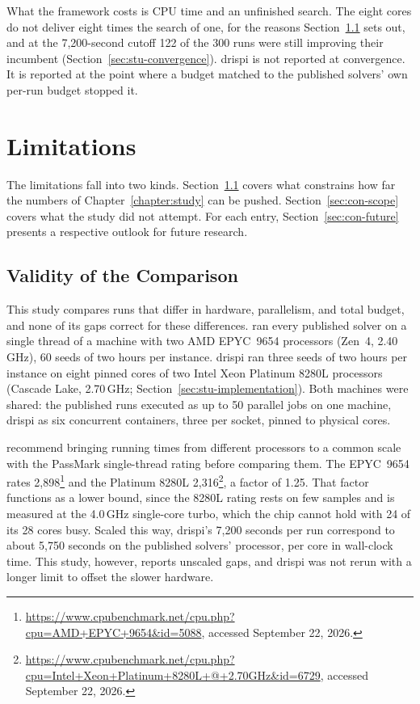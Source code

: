 What the framework costs is CPU time and an unfinished search. The eight cores
do not deliver eight times the search of one, for the reasons
Section~\ref{sec:con-validity} sets out, and at the 7,200-second cutoff
122 of the 300 runs were still improving their incumbent
(Section~\ref{sec:stu-convergence}). \gls{drispi} is not reported at convergence.
It is reported at the point where a budget matched to the published solvers' own
per-run budget stopped it.

\section{Limitations}
\label{sec:con-limitations}

The limitations fall into two kinds. Section~\ref{sec:con-validity}
covers what constrains how far the numbers of Chapter~\ref{chapter:study} can be pushed.
Section~\ref{sec:con-scope} covers what the study did not attempt. For each entry, Section~\ref{sec:con-future} presents a respective outlook for future research.

\subsection{Validity of the Comparison}
\label{sec:con-validity}

This study compares runs that differ in hardware, parallelism, and total budget, and none of its gaps correct for these
differences. \citet{queirogaXLInstancesCapacitated2026} ran every published solver on a single thread
of a machine with two AMD EPYC~9654 processors (Zen~4, 2.40\,GHz), 60 seeds of
two hours per instance. \gls{drispi} ran three seeds of two hours per instance on
eight pinned cores of two Intel Xeon Platinum 8280L processors (Cascade Lake,
2.70\,GHz; Section~\ref{sec:stu-implementation}). Both machines were shared: the
published runs executed as up to 50 parallel jobs on one machine, \gls{drispi} as six
concurrent containers, three per socket, pinned to physical cores.

\citet{accorsiGuidelinesComputationalTesting2022} recommend bringing running times from different
processors to a common scale with the PassMark single-thread rating before
comparing them. The EPYC~9654 rates 2,898\footnote{\url{https://www.cpubenchmark.net/cpu.php?cpu=AMD+EPYC+9654&id=5088}, accessed September 22, 2026.} and the Platinum 8280L 2,316\footnote{\url{https://www.cpubenchmark.net/cpu.php?cpu=Intel+Xeon+Platinum+8280L+@+2.70GHz&id=6729}, accessed September 22, 2026.}, a
factor of 1.25. That factor functions as a lower bound, since the 8280L rating rests on few
samples and is measured at the 4.0\,GHz single-core turbo, which the chip cannot
hold with 24 of its 28 cores busy. Scaled this way, \gls{drispi}'s 7,200 seconds per
run correspond to about 5,750 seconds on the published solvers' processor, per
core in wall-clock time. This study, however, reports unscaled gaps, and \gls{drispi} was not
rerun with a longer limit to offset the slower hardware.

